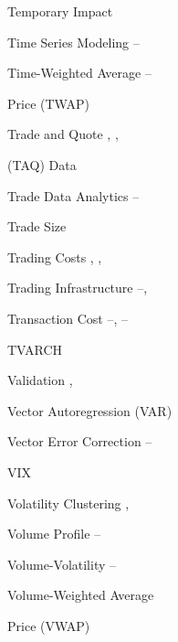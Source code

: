 \begin{multicols}{2}
{Temporary Impact \hfill \pageref{in:tempimpact} \par

Time Series Modeling \hfill \pageref{in:tsm1}--\pageref{in:tsm2} \par

Time-Weighted Average \hfill \pageref{in:twap1}--\pageref{in:twap2} \par \hspace{0.25cm} Price (TWAP) \par

Trade and Quote \hfill \pageref{in:taq1}, \pageref{in:taq2}, \pageref{in:taq3} \par \hspace{0.25cm} (TAQ) Data \par

Trade Data Analytics \hfill \pageref{in:tda1}--\pageref{in:tda2} \par

Trade Size \hfill \pageref{in:tradesize} \par

Trading Costs \hfill \pageref{in:tradecost1}, \pageref{in:tradecost2}, \pageref{in:tradecost3} \par

Trading Infrastructure \hfill \pageref{in:trad_infr1}--\pageref{in:trad_infr2}, \pageref{in:trad_infr3} \par%

Transaction Cost \hfill \pageref{in:transcost1}--\pageref{in:transcost2}, \pageref{in:transcost3}--\pageref{in:transcost4} \par

TVARCH \hfill \pageref{in:tvarch} \pspace





Validation \hfill \pageref{in:validation1}, \pageref{in:validation2} \par

Vector Autoregression (VAR) \hfill \pageref{in:var} \par

Vector Error Correction \hfill \pageref{in:vec1}--\pageref{in:vec2} \par 

VIX \hfill \pageref{in:vix} \par

Volatility Clustering \hfill \pageref{in:volclust1}, \pageref{in:volclust2} \par

Volume Profile \hfill \pageref{in:vol_prof1}--\pageref{in:vol_prof2} \par

Volume-Volatility \hfill \pageref{in:volvol1}--\pageref{in:volvol2} \par

Volume-Weighted Average \hfill \pageref{in:vwap} \par \hspace{0.25cm} Price (VWAP) \par

}
\end{multicols}